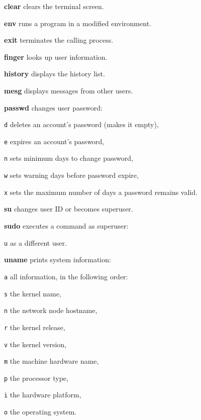 \begin{enumx}
	\item [\cmd] \textbf{clear} clears the terminal screen.
	\item [\cmd] \textbf{env} runs a program in a modified environment.
	\item [\cmd] \textbf{exit} terminates the calling process.
	\item [\cmd] \textbf{finger} looks up user information.
	\item [\cmd] \textbf{history}  displays the history list. %
	\item [\cmd] \textbf{mesg} displays messages from other users.
\end{enumx}

\begin{enumx}
	\item [\cmd] \textbf{passwd} changes user password:
	\item [\texttt{d}] deletes an account's password (makes it empty),
	\item [\texttt{e}] expires an account's password,
	\item [\texttt{n}] sets minimum days to change password,
	\item [\texttt{w}] sets warning days before password expire,
	\item [\texttt{x}] sets the maximum number of days a password remains valid.
\end{enumx}

\begin{enumx}
        \item [\cmd] \textbf{su} changes user ID or becomes superuser.
        \item [\cmd] \textbf{sudo} executes a command as superuser:
        \item [\texttt{u}] as a different user.
\end{enumx}


\begin{enumx}
	\item [\cmd] \textbf{uname} prints system information:
	\item [\texttt{a}] all information, in the following order:
	\item [\texttt{s}] the kernel name,
	\item [\texttt{n}] the network node hostname,
	\item [\texttt{r}] the kernel release,
	\item [\texttt{v}] the kernel version,
	\item [\texttt{m}] the machine hardware name,
	\item [\texttt{p}] the processor type,
	\item [\texttt{i}] the hardware platform,
	\item [\texttt{o}] the operating system.
\end{enumx}

